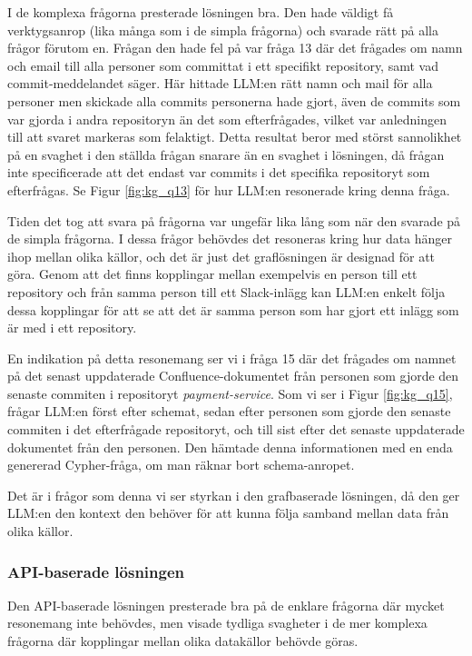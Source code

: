 I de komplexa frågorna presterade lösningen bra. Den hade väldigt få verktygsanrop (lika många som i de simpla frågorna) och svarade rätt på alla frågor förutom en.
Frågan den hade fel på var fråga 13 där det frågades om namn och email till alla personer som committat i ett specifikt repository, samt vad commit-meddelandet säger. 
Här hittade LLM:en rätt namn och mail för alla personer men skickade alla commits personerna hade gjort, även de commits som var gjorda i andra repositoryn än det som efterfrågades, vilket var anledningen till att svaret markeras som felaktigt.
Detta resultat beror med störst sannolikhet på en svaghet i den ställda frågan snarare än en svaghet i lösningen, då frågan inte specificerade att det endast var commits i det specifika repositoryt som efterfrågas.
Se Figur \ref{fig:kg_q13} för hur LLM:en resonerade kring denna fråga.

Tiden det tog att svara på frågorna var ungefär lika lång som när den svarade på de simpla frågorna.
I dessa frågor behövdes det resoneras kring hur data hänger ihop mellan olika källor, och det är just det graflösningen är designad för att göra.
Genom att det finns kopplingar mellan exempelvis en person till ett repository och från samma person till ett Slack-inlägg kan LLM:en enkelt följa dessa kopplingar för att se att det är samma person som har gjort ett inlägg som är med i ett repository.

En indikation på detta resonemang ser vi i fråga 15 där det frågades om namnet på det senast uppdaterade Confluence-dokumentet från personen som gjorde den senaste commiten i repositoryt \textit{payment-service}.
Som vi ser i Figur \ref{fig:kg_q15}, frågar LLM:en först efter schemat, sedan efter personen som gjorde den senaste commiten i det efterfrågade repositoryt, och till sist efter det senaste uppdaterade dokumentet från den personen.
Den hämtade denna informationen med en enda genererad Cypher-fråga, om man räknar bort schema-anropet.

Det är i frågor som denna vi ser styrkan i den grafbaserade lösningen, då den ger LLM:en den kontext den behöver för att kunna följa samband mellan data från olika källor.

\subsubsection{API-baserade lösningen}

Den API-baserade lösningen presterade bra på de enklare frågorna där mycket resonemang inte behövdes, men visade tydliga svagheter i de mer komplexa frågorna där kopplingar mellan olika datakällor behövde göras.

